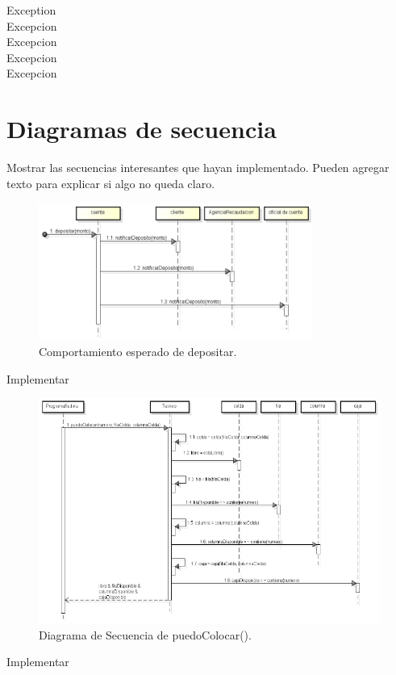 \documentclass[titlepage,a4paper]{article}
\begin{document}
\begin{description}
\item[Exception] 
\item[Excepcion] 
\item[Excepcion] 
\item[Excepcion]
\item[Excepcion]
\end{description}

\section{Diagramas de secuencia}\label{sec:diagramasdesecuencia}
Mostrar las secuencias interesantes que hayan implementado. Pueden agregar texto para explicar si algo no queda claro. 


\begin{figure}[H]
\centering
\includegraphics[width=0.8\textwidth]{diagrama_secuencia01.png}   %
\caption{\label{fig:seq01}Comportamiento esperado de depositar.}
\end{figure}

Implementar

\begin{figure}[H]
\centering
\includegraphics[width=\textwidth]{diagrama_secuencia02.png}
\caption{\label{fig:seq02}Diagrama de Secuencia de puedoColocar().}
\end{figure}

Implementar
\end{document}
